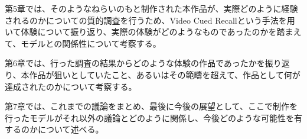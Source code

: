 第5章では、そのようなねらいのもと制作された本作品が、実際どのように経験されるのかについての質的調査を行うため、Video Cued Recallという手法を用いて体験について振り返り、実際の体験がどのようなものであったのかを踏まえて、モデルとの関係性について考察する。

第6章では、行った調査の結果からどのような体験の作品であったかを振り返り、本作品が狙いとしていたこと、あるいはその範疇を超えて、作品として何が達成されたのかについて考察する。

第7章では、これまでの議論をまとめ、最後に今後の展望として、ここで制作を行ったモデルがそれ以外の議論とどのように関係し、今後どのような可能性を有するのかについて述べる。